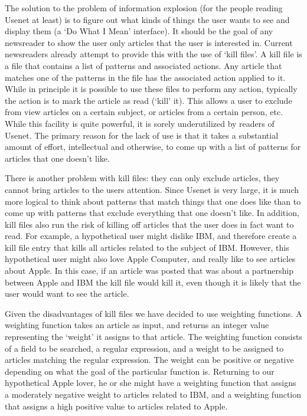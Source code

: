 The solution to the problem of information explosion (for the people reading
Usenet at least) is to figure out what kinds of things the user wants to see
and display them (a `Do What I Mean' interface). It should be the goal of
any newsreader to show the user only articles that the user is interested
in. Current newsreaders already attempt to provide this with the use of
`kill files'. A kill file is a file that contains a list of patterns and
associated actions. Any article that matches one of the patterns in the file
has the associated action applied to it. While in principle it is possible
to use these files to perform any action, typically the action is to mark
the article as read (`kill' it). This allows a user to exclude from view
articles on a certain subject, or articles from a certain person, etc. While
this facility is quite powerful, it is sorely underutilized by readers of
Usenet. The primary reason for the lack of use is that it takes a
substantial amount of effort, intellectual and otherwise, to come up with a
list of patterns for articles that one doesn't like.

There is another problem with kill files: they can only exclude
articles, they cannot bring articles to the users attention. Since
Usenet is very large, it is much more logical to think about patterns
that match things that one does like than to come up with patterns
that exclude everything that one doesn't like. In addition, kill files
also run the risk of killing off articles that the user does in fact
want to read. For example, a hypothetical user might dislike IBM, and
therefore create a kill file entry that kills all articles related to
the subject of IBM. However, this hypothetical user might also love
Apple Computer, and really like to see articles about Apple. In this
case, if an article was posted that was about a partnership between
Apple and IBM the kill file would kill it, even though it is likely
that the user would want to see the article.

Given the disadvantages of kill files we have decided to use weighting
functions. A weighting function takes an article as input, and returns an
integer value representing the `weight' it assigns to that article. The
weighting function consists of a field to be searched, a regular expression,
and a weight to be assigned to articles matching the regular expression. The
weight can be positive or negative depending on what the goal of the
particular function is. Returning to our hypothetical Apple lover, he or she
might have a weighting function that assigns a moderately negative weight to
articles related to IBM, and a weighting function that assigns a high
positive value to articles related to Apple.

